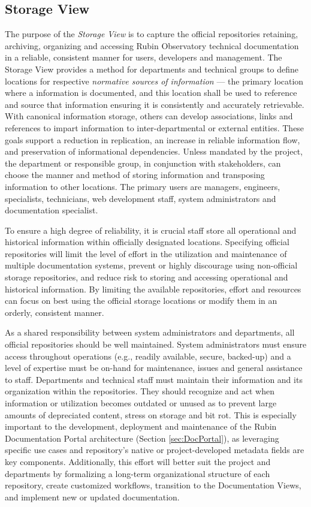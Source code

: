 \subsection{Storage View}
\label{sec:storage-view}

The purpose of the \emph{Storage View} is to capture the official repositories retaining, archiving, organizing and accessing Rubin Observatory technical documentation in a reliable, consistent manner for users, developers and management.
The Storage View provides a method for departments and technical groups to define locations for respective \emph{normative sources of information} --- the primary location where a information is documented, and this location shall be used to reference and source that information ensuring it is consistently and accurately retrievable.
With canonical information storage, others can develop associations, links and references to impart information to inter-departmental or external entities.
These goals support a reduction in replication, an increase in reliable information flow, and preservation of informational dependencies.
Unless mandated by the project, the department or responsible group, in conjunction with stakeholders, can choose the manner and method of storing information and transposing information to other locations.
The primary users are managers, engineers, specialists, technicians, web development staff, system administrators and documentation specialist.

To ensure a high degree of reliability, it is crucial staff store all operational and historical information within officially designated locations.
Specifying official repositories will limit the level of effort in the utilization and maintenance of multiple documentation systems, prevent or highly discourage using non-official storage repositories, and reduce risk to storing and accessing operational and historical information.
By limiting the available repositories, effort and resources can focus on best using the official storage locations or modify them in an orderly, consistent manner.

As a shared responsibility between system administrators and departments, all official repositories should be well maintained.
System administrators must ensure access throughout operations (e.g., readily available, secure, backed-up) and a level of expertise must be on-hand for maintenance, issues and general assistance to staff.
Departments and technical staff must maintain their information and its organization within the repositories.
They should recognize and act when information or utilization becomes outdated or unused as to prevent large amounts of depreciated content, stress on storage and bit rot.
This is especially important to the development, deployment and maintenance of the Rubin Documentation Portal architecture (Section \ref{sec:DocPortal}), as leveraging specific use cases and repository's native or project-developed metadata fields are key components.
Additionally, this effort will better suit the project and departments by formalizing a long-term organizational structure of each repository, create customized workflows, transition to the Documentation Views, and implement new or updated documentation.


